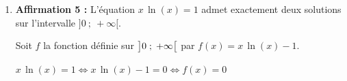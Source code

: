 \begin{enumerate}
\begin{enumerate}
$g(x) \leqslant x \iff x\e^{-x} \leqslant x \iff x \leqslant x\e^{x} \iff 0 \leqslant x\e^{x}-x \iff x\left (\e^{x}-1\right )\geqslant 0$

On établit un tableau de signes:

\begin{center}
{%
\def\esp{\hspace*{3cm}}
$\begin{array}{|c | *{5}{c} |} 
\hline
x  & -\infty & \esp & 0 & \esp  & 2 \\
\hline
x &  & \pmb{-} &  \vline\hspace{-2.7pt}{0} & \pmb{+} &   \\
\hline
\e^{x}-1 &  & \pmb{-} &  \vline\hspace{-2.7pt}{0} & \pmb{+} &   \\
\hline
x\left (\e^{x}-1\right ) &  & \pmb{+} &  \vline\hspace{-2.7pt}{0} & \pmb{+} &   \\
\hline
\end{array}$
}
\end{center}

Donc, pour tout $x$ de $] - \infty~;~2[$, on a $x\left (\e^{x}-1\right ) \geqslant 0$ donc $g(x) \leqslant x$.


 
  \hfill\textbf{Affirmation 4 vraie}
\end{enumerate}
	
\item \textbf{Affirmation 5 :} 
\og  L'équation $x\, \ln (x) = 1$ admet exactement deux solutions sur l'intervalle $]0~;~ +\infty[$. \fg{}

Soit $f$ la fonction définie sur $\left ]0\;;\;+\infty\strut\right [$ par $f(x)=x\,\ln(x)-1$.

$x\, \ln (x) = 1 \iff x\, \ln (x) - 1 = 0 \iff f(x)=0$


\end{enumerate}
